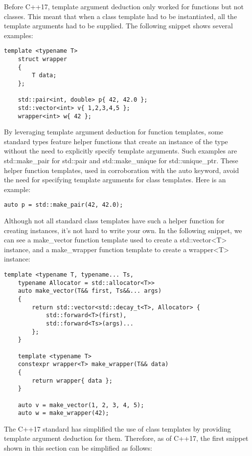 Before C++17, template argument deduction only worked for functions but not classes. This meant that when a class template had to be instantiated, all the template arguments had to be supplied. The following snippet shows several examples:

\begin{lstlisting}[style=styleCXX]
	template <typename T>
	struct wrapper
	{
		T data;
	};
	
	std::pair<int, double> p{ 42, 42.0 };
	std::vector<int> v{ 1,2,3,4,5 };
	wrapper<int> w{ 42 };
\end{lstlisting}

By leveraging template argument deduction for function templates, some standard types feature helper functions that create an instance of the type without the need to explicitly specify template arguments. Such examples are std::make\_pair for std::pair and std::make\_unique for std::unique\_ptr. These helper function templates, used in corroboration with the auto keyword, avoid the need for specifying template arguments for class templates. Here is an example:

\begin{lstlisting}[style=styleCXX]
	auto p = std::make_pair(42, 42.0);
\end{lstlisting}

Although not all standard class templates have such a helper function for creating instances, it’s not hard to write your own. In the following snippet, we can see a make\_vector function template used to create a std::vector<T> instance, and a make\_wrapper function template to create a wrapper<T> instance:

\begin{lstlisting}[style=styleCXX]
	template <typename T, typename... Ts,
	typename Allocator = std::allocator<T>>
	auto make_vector(T&& first, Ts&&... args)
	{
		return std::vector<std::decay_t<T>, Allocator> {
			std::forward<T>(first),
			std::forward<Ts>(args)...
		};
	}
	
	template <typename T>
	constexpr wrapper<T> make_wrapper(T&& data)
	{
		return wrapper{ data };
	}
	
	auto v = make_vector(1, 2, 3, 4, 5);
	auto w = make_wrapper(42);
\end{lstlisting}

The C++17 standard has simplified the use of class templates by providing template argument deduction for them. Therefore, as of C++17, the first snippet shown in this section can be simplified as follows:

